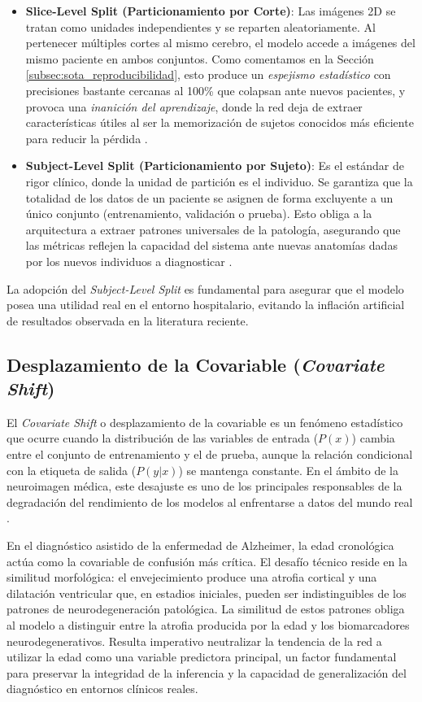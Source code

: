 \documentclass[12pt, oneside, english, spanish]{book}
\begin{document}
\begin{itemize}
	\item \textbf{Slice-Level Split (Particionamiento por Corte)}: Las imágenes 2D se tratan como unidades independientes y se reparten aleatoriamente. Al pertenecer múltiples cortes al mismo cerebro, el modelo accede a imágenes del mismo paciente en ambos conjuntos. Como comentamos en la Sección \ref{subsec:sota_reproducibilidad}, esto produce un \textit{espejismo estadístico} con precisiones bastante cercanas al 100\% que colapsan ante nuevos pacientes, y provoca una \textit{inanición del aprendizaje}, donde la red deja de extraer características útiles al ser la memorización de sujetos conocidos más eficiente para reducir la pérdida \cite{yagis2021}.
	
	\item \textbf{Subject-Level Split (Particionamiento por Sujeto)}: Es el estándar de rigor clínico, donde la unidad de partición es el individuo. Se garantiza que la totalidad de los datos de un paciente se asignen de forma excluyente a un único conjunto (entrenamiento, validación o prueba). Esto obliga a la arquitectura a extraer patrones universales de la patología, asegurando que las métricas reflejen la capacidad del sistema ante nuevas anatomías dadas por los nuevos individuos a diagnosticar \cite{wen2020convolutional}.
\end{itemize}

La adopción del \textit{Subject-Level Split} es fundamental para asegurar que el modelo posea una utilidad real en el entorno hospitalario, evitando la inflación artificial de resultados observada en la literatura reciente.

\subsection{Desplazamiento de la Covariable (\textit{Covariate Shift})} \label{subsec:covariate_shift_teoria}

El \textit{Covariate Shift} o desplazamiento de la covariable es un fenómeno estadístico que ocurre cuando la distribución de las variables de entrada ($P(x)$) cambia entre el conjunto de entrenamiento y el de prueba, aunque la relación condicional con la etiqueta de salida ($P(y|x)$) se mantenga constante. En el ámbito de la neuroimagen médica, este desajuste es uno de los principales responsables de la degradación del rendimiento de los modelos al enfrentarse a datos del mundo real \cite{javaloy2022}.

En el diagnóstico asistido de la enfermedad de Alzheimer, la edad cronológica actúa como la covariable de confusión más crítica. El desafío técnico reside en la similitud morfológica: el envejecimiento produce una atrofia cortical y una dilatación ventricular que, en estadios iniciales, pueden ser indistinguibles de los patrones de neurodegeneración patológica. La similitud de estos patrones obliga al modelo a distinguir entre la atrofia producida por la edad y los biomarcadores neurodegenerativos. Resulta imperativo neutralizar la tendencia de la red a utilizar la edad como una variable predictora principal, un factor fundamental para preservar la integridad de la inferencia y la capacidad de generalización del diagnóstico en entornos clínicos reales.
\end{document}
